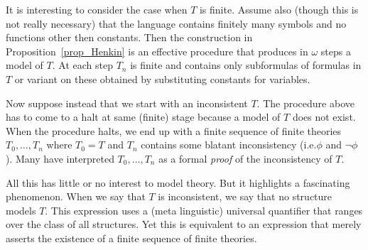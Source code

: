 It is interesting to consider the case when $T$ is finite.
Assume also (though this is not really necessary) that the language contains finitely many symbols and no functions other then constants. Then the construction in Proposition~\ref{prop_Henkin} is an effective procedure that produces in $\omega$ steps a model of $T$. At each step $T_n$ is finite and contains only subformulas of formulas in $T$ or variant on these obtained by substituting constants for variables.

Now suppose instead that we start with an inconsistent $T$.
The procedure above has to come to a halt at same (finite) stage because a model of $T$ does not exist. When the procedure halts, we end up with a finite sequence of finite theories $T_0,\dots, T_n$ where $T_0=T$ and $T_n$ contains some blatant inconsistency (i.e.\@ $\phi$ and $\neg\phi$). Many have interpreted  $T_0,\dots, T_n$ as a formal \textit{proof\/} of the inconsistency of $T$.

All this has little or no interest to model theory.
But it highlights a fascinating phenomenon.
When we say that $T$ is inconsistent, we say that no structure models $T$.
This expression uses a (meta linguistic) universal quantifier that ranges over the class of all structures.
Yet this is equivalent to an expression that merely asserts the existence of a finite sequence of finite theories.






